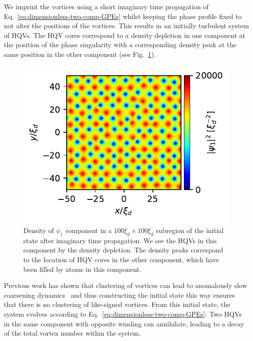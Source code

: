 We imprint the vortices using a short imaginary time propagation of
Eq.~\eqref{eq:dimensionless-two-comp-GPEs} whilst keeping the phase profile
fixed to not alter the positions of the vortices.
This results in an initially turbulent system of HQVs.
The HQV cores correspond to a density depletion in one component at the position
of the phase singularity with a corresponding density peak at the same position
in the other component (see Fig.~\ref{fig:initial-vortex-state}).
\begin{figure}
    \centering
    \includegraphics{gfx/ch-twoCompDynamics/init_state.pdf}
    \caption{Density of \(\psi_1 \) component in a \(100\xi_d\times100\xi_d\)
    subregion of the initial state after imaginary time propagation.
    We see the HQVs in this component by the density depletion.
    The density peaks correspond to the location of HQV cores in the other
    component, which have been filled by atoms in this
    component.\label{fig:initial-vortex-state}}
\end{figure}

Previous work has shown that clustering of vortices can lead to anomalously
slow coarsening dynamics~\cite{Karl2017} and thus constructing the initial
state this way ensures that there is no clustering of like-signed vortices.
From this initial state, the system evolves according to
Eq.~\eqref{eq:dimensionless-two-comp-GPEs}.
Two HQVs in the same component with opposite winding can annihilate, leading to
a decay of the total vortex number within the system.

